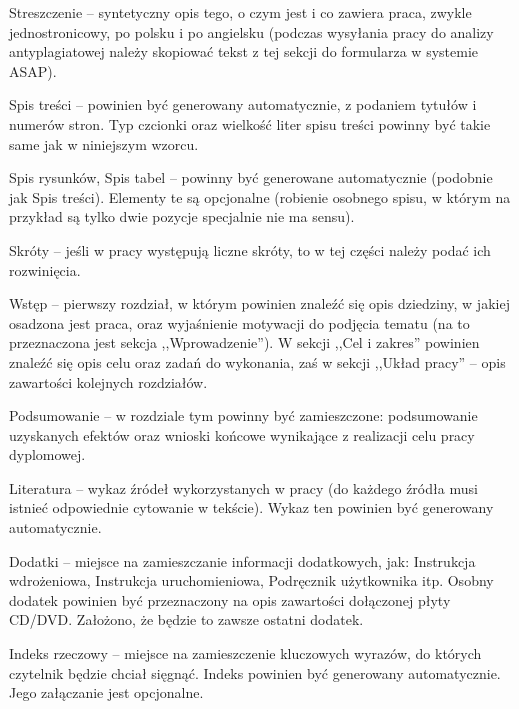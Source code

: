 Streszczenie -- syntetyczny opis tego, o czym jest i co zawiera praca, zwykle jednostronicowy, po polsku i po angielsku (podczas wysyłania pracy do analizy antyplagiatowej należy skopiować tekst z tej sekcji do formularza w systemie ASAP).

Spis treści -- powinien być generowany automatycznie, z podaniem tytułów i numerów stron. Typ czcionki oraz wielkość liter spisu treści powinny być takie same jak w niniejszym wzorcu.

Spis rysunków, Spis tabel -- powinny być generowane automatycznie (podobnie jak Spis treści). Elementy te są opcjonalne (robienie osobnego spisu, w którym na przykład są tylko dwie pozycje specjalnie nie ma sensu).

Skróty -- jeśli w pracy występują liczne skróty, to w tej części należy podać ich rozwinięcia.

Wstęp -- pierwszy rozdział, w którym powinien znaleźć się opis dziedziny, w jakiej osadzona jest praca, oraz wyjaśnienie motywacji do podjęcia tematu (na to przeznaczona jest sekcja ,,Wprowadzenie''). W sekcji ,,Cel i zakres'' powinien znaleźć się opis celu oraz zadań do wykonania, zaś w sekcji ,,Układ pracy'' -- opis zawartości kolejnych rozdziałów.

Podsumowanie -- w rozdziale tym powinny być zamieszczone: podsumowanie uzyskanych efektów oraz wnioski końcowe wynikające z realizacji celu pracy dyplomowej.

Literatura -- wykaz źródeł wykorzystanych w pracy (do każdego źródła musi istnieć odpowiednie cytowanie w tekście). Wykaz ten powinien być generowany automatycznie.

Dodatki -- miejsce na zamieszczanie informacji dodatkowych, jak: Instrukcja wdrożeniowa, Instrukcja uruchomieniowa, Podręcznik użytkownika itp.
Osobny dodatek powinien być przeznaczony na opis zawartości dołączonej płyty CD/DVD. Założono, że będzie to zawsze ostatni dodatek.

Indeks rzeczowy -- miejsce na zamieszczenie kluczowych wyrazów, do których czytelnik będzie chciał sięgnąć. Indeks powinien być generowany automatycznie. Jego załączanie jest opcjonalne.
